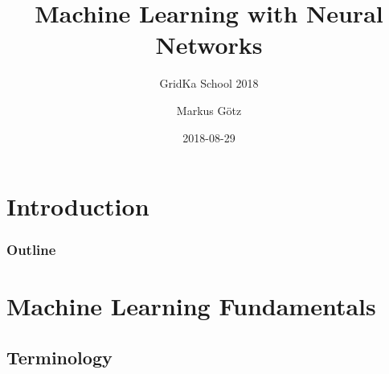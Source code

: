 \documentclass[aspectratio=169]{beamer}
\title{Machine Learning with Neural Networks}
\subtitle{GridKa School 2018}
\author{Markus Götz}
\date{2018-08-29}
\institute{KIT}
\begin{document}
    
\section{Introduction}
\label{sec:introduction}

\maketitle

\begin{frame}
\frametitle{Outline}
    \tableofcontents[hideallsubsections]
\end{frame}

\section{Machine Learning Fundamentals}
\label{sec:machine-learning}

\subsection{Terminology}
\label{subsec:terminology}
\end{document}
